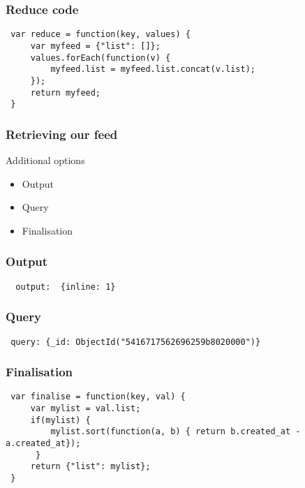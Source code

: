 \documentclass[10pt]{beamer}
\begin{document}
\begin{frame}[fragile]
  \frametitle{Reduce code}

 \begin{verbatim}
 var reduce = function(key, values) {
     var myfeed = {"list": []};
     values.forEach(function(v) {
         myfeed.list = myfeed.list.concat(v.list);
     });
     return myfeed;
 }
	     \end{verbatim}

\end{frame}


\begin{frame}
  \frametitle{Retrieving our feed}

  Additional options
 \begin{itemize}
  \item Output
  \item Query
  \item Finalisation
 \end{itemize}


\end{frame}
\begin{frame}[fragile]

  \frametitle{Output}

 \begin{verbatim}
  output:  {inline: 1}
 \end{verbatim}

\end{frame}


\begin{frame}[fragile]
  \frametitle{Query}

 \begin{verbatim}
 query: {_id: ObjectId("5416717562696259b8020000")}
 \end{verbatim}

\end{frame}


\begin{frame}[fragile]
  \frametitle{Finalisation}

 \begin{verbatim}
 var finalise = function(key, val) {
     var mylist = val.list;
     if(mylist) {
         mylist.sort(function(a, b) { return b.created_at - a.created_at});
      }
     return {"list": mylist};
 }

 \end{verbatim}

\end{frame}
\end{document}
